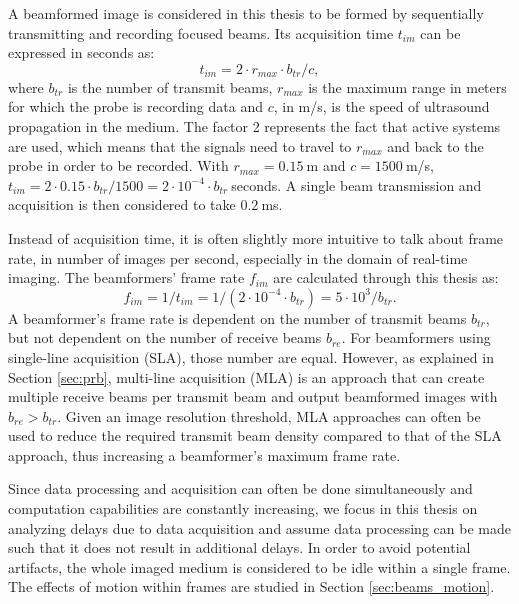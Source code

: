A beamformed image is considered in this thesis to be formed by sequentially transmitting and recording focused beams. Its acquisition time $t_{im}$ can be expressed in seconds as:
\begin{equation}
    t_{im} = 2 \cdot r_{max} \cdot b_{tr} / c,
\label{eq:acquisition_time}
\end{equation}
\noindent
where $b_{tr}$ is the number of transmit beams, $r_{max}$ is the maximum range in meters for which the probe is recording data and $c$, in m/s, is the speed of ultrasound propagation in the medium. The factor 2 represents the fact that active systems are used, which means that the signals need to travel to $r_{max}$ and back to the probe in order to be recorded. With $r_{max} = 0.15~$m and $c = 1500~$m/s, $t_{im} = 2 \cdot 0.15 \cdot b_{tr} / 1500 =  2 \cdot 10^{-4} \cdot b_{tr}~$seconds. A single beam transmission and acquisition is then considered to take $0.2~$ms.

Instead of acquisition time, it is often slightly more intuitive to talk about frame rate, in number of images per second, especially in the domain of real-time imaging. The beamformers' frame rate $f_{im}$ are calculated through this thesis as:
\begin{equation}
    f_{im} = 1 / t_{im} = 1 / (2 \cdot 10^{-4} \cdot b_{tr}) = 5 \cdot 10^3 / b_{tr}.
\label{eq:frame_rate}
\end{equation}
\noindent
A beamformer's frame rate is dependent on the number of transmit beams $b_{tr}$, but not dependent on the number of receive beams $b_{re}$. For beamformers using single-line acquisition (SLA), those number are equal. However, as explained in Section \ref{sec:prb}, multi-line acquisition (MLA) is an approach that can create multiple receive beams per transmit beam and output beamformed images with $b_{re} > b_{tr}$.
Given an image resolution threshold, MLA approaches can often be used to reduce the required transmit beam density compared to that of the SLA approach, thus increasing a beamformer's maximum frame rate.

Since data processing and acquisition can often be done simultaneously and computation capabilities are constantly increasing, we focus in this thesis on analyzing delays due to data acquisition and assume data processing can be made such that it does not result in additional delays.
In order to avoid potential artifacts, the whole imaged medium is considered to be idle within a single frame. The effects of motion within frames are studied in Section \ref{sec:beams_motion}.

